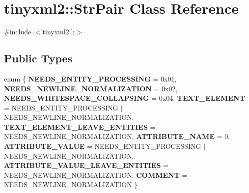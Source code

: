 \section{tinyxml2\+:\+:Str\+Pair Class Reference}
\label{classtinyxml2_1_1_str_pair}


{\ttfamily \#include $<$tinyxml2.\+h$>$}

\subsection*{Public Types}
\begin{DoxyCompactItemize}
\item 
enum \{ \newline
\textbf{ N\+E\+E\+D\+S\+\_\+\+E\+N\+T\+I\+T\+Y\+\_\+\+P\+R\+O\+C\+E\+S\+S\+I\+NG} = 0x01, 
\textbf{ N\+E\+E\+D\+S\+\_\+\+N\+E\+W\+L\+I\+N\+E\+\_\+\+N\+O\+R\+M\+A\+L\+I\+Z\+A\+T\+I\+ON} = 0x02, 
\textbf{ N\+E\+E\+D\+S\+\_\+\+W\+H\+I\+T\+E\+S\+P\+A\+C\+E\+\_\+\+C\+O\+L\+L\+A\+P\+S\+I\+NG} = 0x04, 
\textbf{ T\+E\+X\+T\+\_\+\+E\+L\+E\+M\+E\+NT} = N\+E\+E\+D\+S\+\_\+\+E\+N\+T\+I\+T\+Y\+\_\+\+P\+R\+O\+C\+E\+S\+S\+I\+NG $\vert$ N\+E\+E\+D\+S\+\_\+\+N\+E\+W\+L\+I\+N\+E\+\_\+\+N\+O\+R\+M\+A\+L\+I\+Z\+A\+T\+I\+ON, 
\newline
\textbf{ T\+E\+X\+T\+\_\+\+E\+L\+E\+M\+E\+N\+T\+\_\+\+L\+E\+A\+V\+E\+\_\+\+E\+N\+T\+I\+T\+I\+ES} = N\+E\+E\+D\+S\+\_\+\+N\+E\+W\+L\+I\+N\+E\+\_\+\+N\+O\+R\+M\+A\+L\+I\+Z\+A\+T\+I\+ON, 
\textbf{ A\+T\+T\+R\+I\+B\+U\+T\+E\+\_\+\+N\+A\+ME} = 0, 
\textbf{ A\+T\+T\+R\+I\+B\+U\+T\+E\+\_\+\+V\+A\+L\+UE} = N\+E\+E\+D\+S\+\_\+\+E\+N\+T\+I\+T\+Y\+\_\+\+P\+R\+O\+C\+E\+S\+S\+I\+NG $\vert$ N\+E\+E\+D\+S\+\_\+\+N\+E\+W\+L\+I\+N\+E\+\_\+\+N\+O\+R\+M\+A\+L\+I\+Z\+A\+T\+I\+ON, 
\textbf{ A\+T\+T\+R\+I\+B\+U\+T\+E\+\_\+\+V\+A\+L\+U\+E\+\_\+\+L\+E\+A\+V\+E\+\_\+\+E\+N\+T\+I\+T\+I\+ES} = N\+E\+E\+D\+S\+\_\+\+N\+E\+W\+L\+I\+N\+E\+\_\+\+N\+O\+R\+M\+A\+L\+I\+Z\+A\+T\+I\+ON, 
\newline
\textbf{ C\+O\+M\+M\+E\+NT} = N\+E\+E\+D\+S\+\_\+\+N\+E\+W\+L\+I\+N\+E\+\_\+\+N\+O\+R\+M\+A\+L\+I\+Z\+A\+T\+I\+ON
 \}
\end{DoxyCompactItemize}
